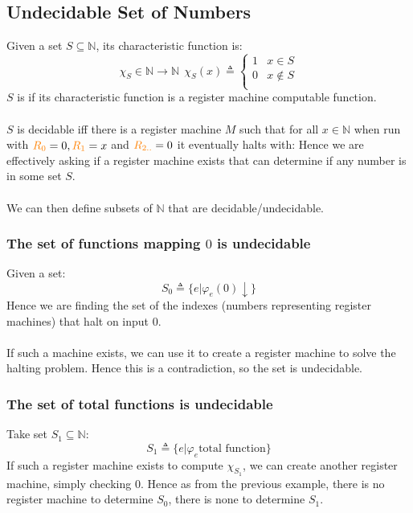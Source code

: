 \documentclass{report}
\begin{document}
        \subsection*{Undecidable Set of Numbers}
            Given a set $S \subseteq \mathbb{N}$, its characteristic function is:
            \[\chi_S \in \mathbb{N} \to \mathbb{N} \ \ \chi_S(x) \triangleq \begin{cases}
                1 & x \in S \\
                0 & x \not\in S \\
            \end{cases}\]
            $S$ is  if its characteristic function is a register machine computable function.
            \\
            \\ $S$ is decidable iff there is a register machine $M$ such that for all $x \in \mathbb{N}$ when run with $\text{\textcolor{orange}{$R_{0}$}} = 0, \text{\textcolor{orange}{$R_{1}$}} = x$ and $\text{\textcolor{orange}{$R_{2..}$}} = 0$ it eventually halts with:
            Hence we are effectively asking if a register machine exists that can determine if any number is in some set $S$.
            \\
            \\ We can then define subsets of $\mathbb{N}$ that are decidable/undecidable.

            \subsubsection*{The set of functions mapping $0$ is undecidable}
                Given a set:
                \[S_0 \triangleq \{e | \varphi_e(0)\downarrow\}\]
                Hence we are finding the set of the indexes (numbers representing register machines) that halt on input $0$.
                \\
                \\ If such a machine exists, we can use it to create a register machine to solve the halting problem. Hence this is a contradiction, so the set is undecidable.

            \subsubsection*{The set of total functions is undecidable}
                Take set $S_1 \subseteq \mathbb{N}$:
                \[S_1 \triangleq \{e | \varphi_e\text{total function}\}\]
                If such a register machine exists to compute $\chi_{S_1}$, we can create another register machine, simply checking $0$. Hence as from the previous example, there is no register machine to determine $S_0$, there is none to determine $S_1$.
\end{document}
